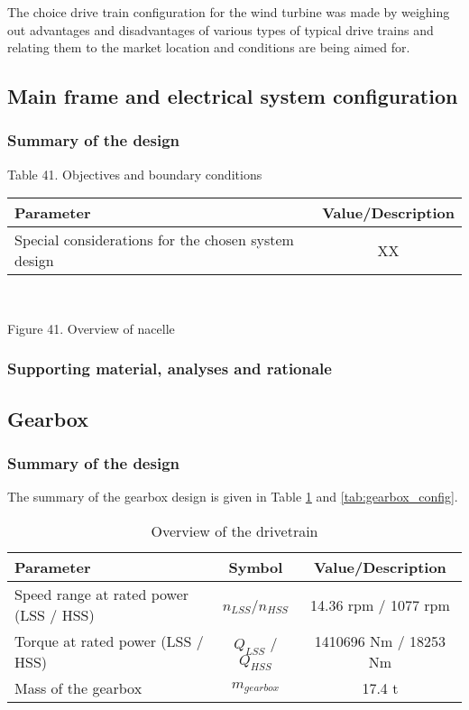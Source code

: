 The choice drive train configuration for the wind turbine was made by weighing out advantages and disadvantages of various types of typical drive trains and relating them to the market location and conditions are being aimed for. 
\subsection{Main frame and electrical system configuration}

\subsubsection{Summary of the design}


\begin{center}
Table 41. Objectives and boundary conditions\\
\begin{tabular}{ |l|c| } 
\hline
\textbf{Parameter} & \textbf{Value/Description}  \\ 
\hline
Special considerations for the chosen system design & XX  \\ 
\hline
\end{tabular} \\
\end{center}



Figure 41. Overview of nacelle

\subsubsection{Supporting material, analyses and rationale}


\newpage

\subsection{Gearbox}

\subsubsection{Summary of the design}

The summary of the gearbox design is given in Table \ref{tab:overview_drivetrain} and \ref{tab:gearbox_config}. 

\begin{table}[h]
\centering
\caption{Overview of the drivetrain}
\label{tab:overview_drivetrain}
\begin{tabular}{ |l|c|c| } 
\hline
\textbf{Parameter} & \textbf{Symbol} & \textbf{Value/Description}\\ 
\hline
Speed range at rated power (LSS / HSS) & $n_{LSS}$/$n_{HSS}$&  14.36 rpm / 1077 rpm \\ 
Torque at rated power (LSS / HSS) & $Q_{LSS}$ / $Q_{HSS}$ & 1410696 Nm / 18253 Nm\\
Mass of the gearbox & $m_{gearbox}$ & 17.4 t\\
\hline
\end{tabular} \\
\end{table}

